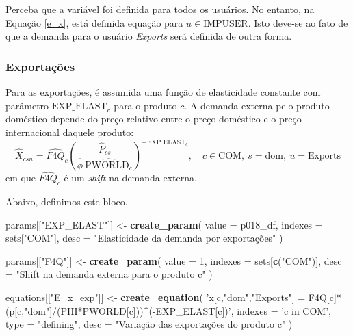 \documentclass[12pt,twoside]{article}
\newenvironment{Shaded}{\begin{snugshade}}{\end{snugshade}}
\newcommand{\DataTypeTok}[1]{\textcolor[rgb]{0.13,0.29,0.53}{#1}}
\newcommand{\DecValTok}[1]{\textcolor[rgb]{0.00,0.00,0.81}{#1}}
\newcommand{\KeywordTok}[1]{\textcolor[rgb]{0.13,0.29,0.53}{\textbf{#1}}}
\newcommand{\NormalTok}[1]{#1}
\newcommand{\StringTok}[1]{\textcolor[rgb]{0.31,0.60,0.02}{#1}}
\let\oldShaded\Shaded
\let\endoldShaded\endShaded
\renewenvironment{Shaded}{\footnotesize\oldShaded}{\endoldShaded}
\begin{document}
Perceba que a variável foi definida para todos os usuários. No entanto,
na Equação \ref{e_x}, está definida equação para
\(u \in \text{IMPUSER}\). Isto deve-se ao fato de que a demanda para o
usuário \emph{Exports} será definida de outra forma.

\hypertarget{exportauxe7uxf5es}{%
\subsubsection{Exportações}\label{exportauxe7uxf5es}}

Para as exportações, é assumida uma função de elasticidade constante com
parâmetro \(\text{EXP\_ELAST}_c\) para o produto \(c\). A demanda
externa pelo produto doméstico depende do preço relativo entre o preço
doméstico e o preço internacional daquele produto:
\[\hat{X}_{csu} = \hat{F4Q}_c \left(\frac{\hat{P}_{cs}}{\hat{\phi}~\hat{\text{PWORLD}_c}}\right)^{-\text{EXP ELAST}_c}, \quad c \in \text{COM},~s = \text{dom},~u=\text{Exports}\]
em que \(\hat{F4Q}_c\) é um \emph{shift} na demanda externa.

Abaixo, definimos este bloco.

\begin{Shaded}
\begin{Highlighting}[]
\NormalTok{params[[}\StringTok{"EXP_ELAST"}\NormalTok{]] <-}\StringTok{ }\KeywordTok{create_param}\NormalTok{(}
  \DataTypeTok{value =}\NormalTok{ p018_df,}
  \DataTypeTok{indexes =}\NormalTok{ sets[}\StringTok{"COM"}\NormalTok{],}
  \DataTypeTok{desc =} \StringTok{"Elasticidade da demanda por exportações"}
\NormalTok{)}

\NormalTok{params[[}\StringTok{"F4Q"}\NormalTok{]] <-}\StringTok{ }\KeywordTok{create_param}\NormalTok{(}
  \DataTypeTok{value =} \DecValTok{1}\NormalTok{,}
  \DataTypeTok{indexes =}\NormalTok{ sets[}\KeywordTok{c}\NormalTok{(}\StringTok{"COM"}\NormalTok{)],}
  \DataTypeTok{desc =} \StringTok{"Shift na demanda externa para o produto c"}
\NormalTok{)}

\NormalTok{equations[[}\StringTok{"E_x_exp"}\NormalTok{]] <-}\StringTok{ }\KeywordTok{create_equation}\NormalTok{(}
  \StringTok{'x[c,"dom","Exports"] = F4Q[c]*(p[c,"dom"]/(PHI*PWORLD[c]))^(-EXP_ELAST[c])'}\NormalTok{,}
  \DataTypeTok{indexes =} \StringTok{'c in COM'}\NormalTok{,}
  \DataTypeTok{type =} \StringTok{"defining"}\NormalTok{,}
  \DataTypeTok{desc =} \StringTok{"Variação das exportações do produto c"}
\NormalTok{)}
\end{Highlighting}
\end{Shaded}
\end{document}

